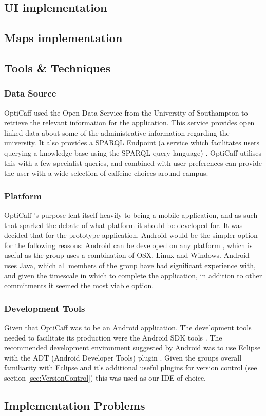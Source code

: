 \subsection{UI implementation}
\subsection{Maps implementation}

\subsection{Tools \& Techniques}

\subsubsection{Data Source}
OptiCaff used the Open Data Service from the University of Southampton \cite{DataSouthampton} to retrieve the relevant information for the application. This service provides open linked data about some of the administrative information regarding the university. It also provides a SPARQL Endpoint \cite{SotonSparql} (a service which facilitates users querying a knowledge base using the SPARQL query language) \cite{SparqlEndpoint}. OptiCaff utilises this with a few specialist queries, and combined with user preferences can provide the user with a wide selection of caffeine choices around campus. 

\subsubsection{Platform}
OptiCaff ’s purpose lent itself heavily to being a mobile application, and as such that sparked the debate of what platform it should be developed for. It was decided that for the prototype application, Android \cite{Android} would be the simpler option for the following reasons:
Android can be developed on any platform \cite{SDKAllOS}, which is useful as the group uses a combination of OSX, Linux and Windows. 
Android uses Java, which all members of the group have had significant experience with, and given the timescale in which to complete the application, in addition to other commitments it seemed the most viable option. 

\subsubsection{Development Tools}
Given that OptiCaff was to be an Android application. The development tools needed to facilitate its production were the Android SDK tools \cite{AndroidSDK}. The recommended development environment suggested by Android was to use Eclipse \cite{Eclipse} with the ADT (Android Developer Tools) plugin \cite{SDKAllOS}. Given the groups overall familiarity with Eclipse and it’s additional useful plugins for version control (see section \ref{sec:VersionControl}) this was used as our IDE of choice.

\subsection{Implementation Problems}



